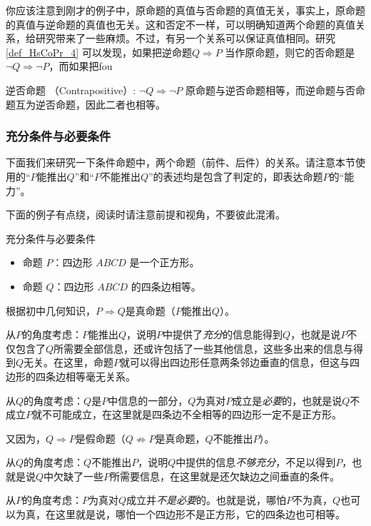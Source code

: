 你应该注意到刚才的例子中，原命题的真值与否命题的真值无关，事实上，原命题的真值与逆命题的真值也无关。这和否定不一样，可以明确知道两个命题的真值关系，给研究带来了一些麻烦。不过，有另一个关系可以保证真值相同。研究\autoref{def_HsCoPr_4} 可以发现，如果把逆命题$Q \Rightarrow P$ 当作原命题，则它的否命题是$\neg Q \Rightarrow \neg P $，而如果把fou





逆否命题 （Contrapositive）:  $\neg Q \Rightarrow \neg P $
原命题与逆否命题相等，而逆命题与否命题互为逆否命题，因此二者也相等。

\subsubsection{充分条件与必要条件}

下面我们来研究一下条件命题中，两个命题（前件、后件）的关系。请注意本节使用的“$P$能推出$Q$”和“$P$不能推出$Q$”的表述均是包含了判定的，即表达命题$P$的“能力”。

下面的例子有点绕，阅读时请注意前提和视角，不要彼此混淆。

\begin{example}{充分条件与必要条件}
\begin{itemize}
\item 命题 $P$：四边形 $ABCD$ 是一个正方形。
\item 命题 $Q$：四边形 $ABCD$ 的四条边相等。
\end{itemize}

根据初中几何知识，$P\Rightarrow Q$是真命题（$P$能推出$Q$）。

从$P$的角度考虑：$P$能推出$Q$，说明$P$中提供了\textsl{充分}的信息能得到$Q$，也就是说$P$不仅包含了$Q$所需要全部信息，还或许包括了一些其他信息，这些多出来的信息与得到$Q$无关。在这里，命题$P$就可以得出四边形任意两条邻边垂直的信息，但这与四边形的四条边相等毫无关系。

从$Q$的角度考虑：$Q$是$P$中信息的一部分，$Q$为真对$P$成立是\textsl{必要}的，也就是说$Q$不成立$P$就不可能成立，在这里就是四条边不全相等的四边形一定不是正方形。

又因为，$Q\Rightarrow P$是假命题（$Q\not\Rightarrow P$是真命题，$Q$不能推出$P$）。

从$Q$的角度考虑：$Q$不能推出$P$，说明$Q$中提供的信息\textsl{不够充分}，不足以得到$P$，也就是说$Q$中欠缺了一些$P$所需要信息，在这里就是还欠缺边之间垂直的条件。

从$P$的角度考虑：$P$为真对$Q$成立并\textsl{不是必要}的。也就是说，哪怕$P$不为真，$Q$也可以为真，在这里就是说，哪怕一个四边形不是正方形，它的四条边也可相等。
\end{example}

